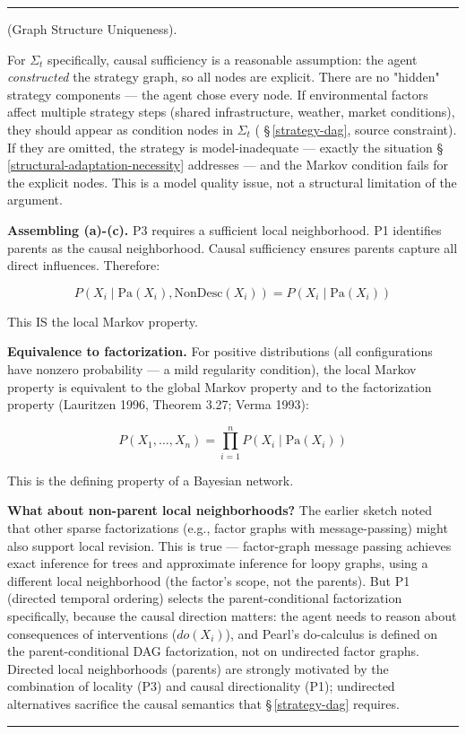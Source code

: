 \documentclass[11pt,oneside]{article}
\newcounter{claim}[section]
\renewcommand{\theclaim}{\thesection.\arabic{claim}}
\newenvironment{segment}[2]{%
  \refstepcounter{claim}%
  \bigskip\noindent\hrule\smallskip
  \noindent{\bfseries #1~\theclaim}\enskip(#2).\par\smallskip
  \noindent\ignorespaces
}{%
  \par\smallskip\noindent\hrule\bigskip
}
\newenvironment{derivation}[1][]{\begin{segment}{Derivation}{#1}}{\end{segment}}
\begin{document}
\begin{derivation}[Graph Structure Uniqueness]
For $\Sigma_t$ specifically, causal sufficiency is a reasonable assumption: the agent \textit{constructed} the strategy graph, so all nodes are explicit. There are no "hidden" strategy components — the agent chose every node. If environmental factors affect multiple strategy steps (shared infrastructure, weather, market conditions), they should appear as condition nodes in $\Sigma_t$ ( \S\,\ref{strategy-dag}, source constraint). If they are omitted, the strategy is model-inadequate — exactly the situation \S\,\ref{structural-adaptation-necessity} addresses — and the Markov condition fails for the explicit nodes. This is a model quality issue, not a structural limitation of the argument.

\textbf{Assembling (a)-(c).} P3 requires a sufficient local neighborhood. P1 identifies parents as the causal neighborhood. Causal sufficiency ensures parents capture all direct influences. Therefore:

$$P(X_i \mid \text{Pa}(X_i), \text{NonDesc}(X_i)) = P(X_i \mid \text{Pa}(X_i))$$

This IS the local Markov property.

\textbf{Equivalence to factorization.} For positive distributions (all configurations have nonzero probability — a mild regularity condition), the local Markov property is equivalent to the global Markov property and to the factorization property (Lauritzen 1996, Theorem 3.27; Verma 1993):

$$P(X_1, \ldots, X_n) = \prod_{i=1}^{n} P(X_i \mid \text{Pa}(X_i))$$

This is the defining property of a Bayesian network.

\textbf{What about non-parent local neighborhoods?} The earlier sketch noted that other sparse factorizations (e.g., factor graphs with message-passing) might also support local revision. This is true — factor-graph message passing achieves exact inference for trees and approximate inference for loopy graphs, using a different local neighborhood (the factor's scope, not the parents). But P1 (directed temporal ordering) selects the parent-conditional factorization specifically, because the causal direction matters: the agent needs to reason about consequences of interventions ($do(X_i)$), and Pearl's do-calculus is defined on the parent-conditional DAG factorization, not on undirected factor graphs. Directed local neighborhoods (parents) are strongly motivated by the combination of locality (P3) and causal directionality (P1); undirected alternatives sacrifice the causal semantics that \S\,\ref{strategy-dag} requires.


\end{derivation}
\end{document}
